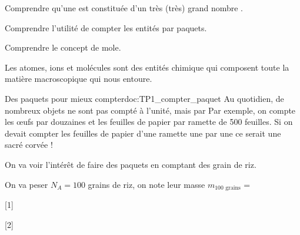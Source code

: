 \teteSndMole

\vspace*{-32pt}


\begin{objectifs}
  \item Comprendre qu'une  est constituée d'un très (très) grand nombre .
  \item Comprendre l'utilité de compter les entités par paquets.
  \item Comprendre le concept de mole.
\end{objectifs}

\begin{contexte}  
  Les atomes, ions et molécules sont des entités chimique qui composent toute la matière macroscopique qui nous entoure.
  
\end{contexte}



\begin{doc}{Des paquets pour mieux compter}{doc:TP1_compter_paquet}
  Au quotidien, de nombreux objets ne sont pas compté à l'unité, mais par 
  Par exemple, on compte les œufs par douzaines et les feuilles de papier par ramette de 500 feuilles.
  Si on devait compter les feuilles de papier d'une ramette une par une ce serait une sacré corvée !

  On va voir l'intérêt de faire des paquets en comptant des grain de riz.
\end{doc}

\mesure On va peser $N_A = 100$ grains de riz, on note leur masse $m_\text{100 grains}$ = 

[1]

[2]

